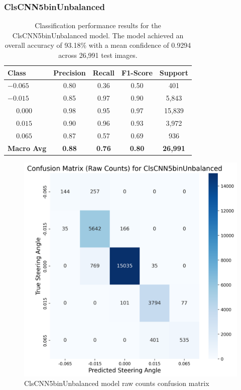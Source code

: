 \subsubsection{ClsCNN5binUnbalanced}

\begin{table}[htbp]
\centering
\begin{tabular}{@{}lcccc@{}}
\toprule
\textbf{Class} & \textbf{Precision} & \textbf{Recall} & \textbf{F1-Score} & \textbf{Support} \\
\midrule
$-0.065$ & 0.80 & 0.36 & 0.50 & 401 \\
$-0.015$ & 0.85 & 0.97 & 0.90 & 5,843 \\
$\phantom{-}0.000$ & 0.98 & 0.95 & 0.97 & 15,839 \\
$\phantom{-}0.015$ & 0.90 & 0.96 & 0.93 & 3,972 \\
$\phantom{-}0.065$ & 0.87 & 0.57 & 0.69 & 936 \\
\midrule
\textbf{Macro Avg} & \textbf{0.88} & \textbf{0.76} & \textbf{0.80} & \textbf{26,991} \\
\bottomrule
\end{tabular}
\caption{Classification performance results for the ClsCNN5binUnbalanced model. The model achieved an overall accuracy of 93.18\% with a mean confidence of 0.9294 across 26,991 test images.}
\label{tab:clf_report_ClsCNN5binUnbalanced}
\end{table}

\begin{figure}[H]
\centering
\includegraphics[width=0.65\linewidth]{Figures/Results/cm_raw_ClsCNN5binUnbalanced.png}
\caption{ClsCNN5binUnbalanced model raw counts confusion matrix}
\label{fig:cm_raw_ClsCNN5binUnbalanced}
\end{figure}

